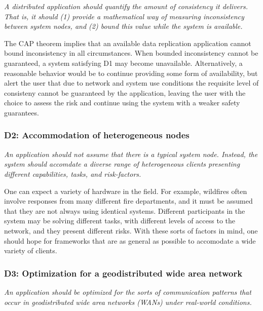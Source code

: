 \documentclass[]             %
{NASA}                       %
\theoremstyle{definition}
\begin{document}
\emph{A distributed application should quantify the amount of
consistency it delivers. That is, it should (1) provide a mathematical
way of measuring inconsistency between system nodes, and (2) bound
this value while the system is available.}

The CAP theorem implies that an available data replication application
cannot bound inconsistency in all circumstances. When bounded
inconsistency cannot be guaranteed, a system satisfying D1 may become
unavailable. Alternatively, a reasonable behavior would be to continue
providing some form of availability, but alert the user that due to
network and system use conditions the requisite level of consisteny
cannot be guaranteed by the application, leaving the user with the
choice to assess the risk and continue using the system with a weaker
safety guarantees.

\hypertarget{d2-accommodation-of-heterogeneous-nodes}{%
\subsubsection{D2: Accommodation of heterogeneous
nodes}\label{d2-accommodation-of-heterogeneous-nodes}}

\emph{An application should not assume that there is a typical system
node. Instead, the system should accomdate a diverse range of
heterogeneous clients presenting different capabilities, tasks, and
risk-factors.}

One can expect a variety of hardware in the field. For example,
wildfires often involve responses from many different fire departments,
and it must be assumed that they are not always using identical systems.
Different participants in the system may be solving different tasks,
with different levels of access to the network, and they present
different risks. With these sorts of factors in mind, one should hope
for frameworks that are as general as possible to accomodate a wide
variety of clients.

\hypertarget{d3-optimization-for-a-geodistributed-wide-area-network}{%
\subsubsection{D3: Optimization for a geodistributed wide area
network}\label{d3-optimization-for-a-geodistributed-wide-area-network}}

\emph{An application should be optimized for the sorts of
communication patterns that occur in geodistributed wide area networks
(WANs) under real-world conditions.}
\end{document}
